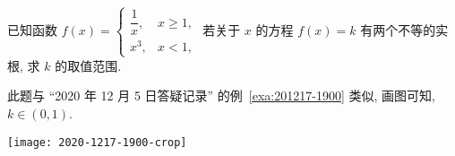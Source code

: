 \begin{example}
    已知函数 $f(x)= \begin{cases}
        \dfrac1x, & x\geqslant 1,\\
        x^3, & x<1,
    \end{cases}$ 若关于 $x$ 的方程 $f(x)=k$ 有两个不等的实根, 求 $k$ 的取值范围.
\end{example}
\begin{solution}
    此题与 ``2020 年 12 月 5 日答疑记录'' 的例~\ref{exa:201217-1900} 类似, 画图可知, $k\in(0,1)$.
    
    \begin{center}
        \texttt{[image: 2020-1217-1900-crop]}
    \end{center}
\end{solution}


